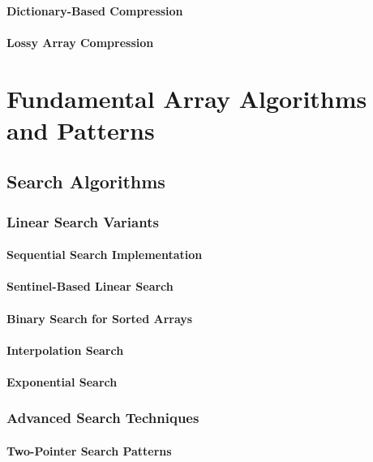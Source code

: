 \documentclass[12pt, oneside]{book}
\begin{document}
\subsubsection{Dictionary-Based Compression}
\subsubsection{Lossy Array Compression}


\chapter{Fundamental Array Algorithms and Patterns}

\section{Search Algorithms}
\subsection{Linear Search Variants}
\subsubsection{Sequential Search Implementation}
\subsubsection{Sentinel-Based Linear Search}
\subsubsection{Binary Search for Sorted Arrays}
\subsubsection{Interpolation Search}
\subsubsection{Exponential Search}

\subsection{Advanced Search Techniques}
\subsubsection{Two-Pointer Search Patterns}
\end{document}
